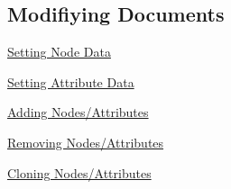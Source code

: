  \par
 \hypertarget{XMLManual_XMLModifying}{}\subsection{Modifiying Documents}\label{XMLManual_XMLModifying}

\begin{DoxyItemize}
\item \hyperlink{XMLManual_XMLModifyingNodeData}{Setting Node Data}
\item \hyperlink{XMLManual_XMLModifyingAttributeData}{Setting Attribute Data}
\item \hyperlink{XMLManual_XMLModifyingAdding}{Adding Nodes/Attributes}
\item \hyperlink{XMLManual_XMLModifyingRemoving}{Removing Nodes/Attributes}
\item \hyperlink{XMLManual_XMLModifyingCloning}{Cloning Nodes/Attributes}
\end{DoxyItemize}

